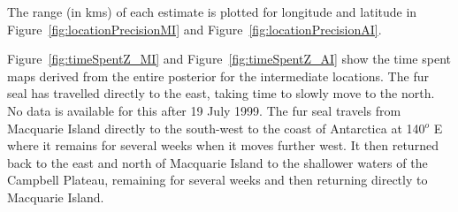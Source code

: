 \documentclass[10pt]{article}
\begin{document}
The range (in kms) of each estimate is plotted for longitude and
latitude in Figure~\ref{fig:locationPrecisionMI} and
Figure~\ref{fig:locationPrecisionAI}.

Figure~\ref{fig:timeSpentZ_MI} and Figure~\ref{fig:timeSpentZ_AI} show
the time spent maps derived from the entire posterior for the
intermediate locations. The fur seal has travelled directly to the
east, taking time to slowly move to the north. No data is available
for this after 19 July 1999. The fur seal travels from Macquarie Island
directly to the south-west to the coast of Antarctica at 140$^o$ E
where it remains for several weeks when it moves further west. It then
returned back to the east and north of Macquarie Island to the
shallower waters of the Campbell Plateau, remaining for several weeks
and then returning directly to Macquarie Island.

  







\end{document}
